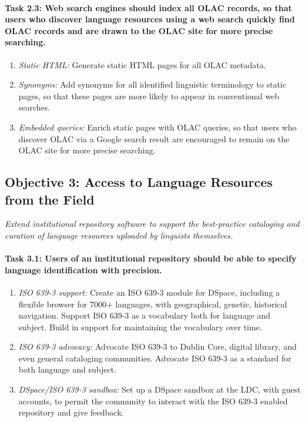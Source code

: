 \def\task{2.3}
\paragraph{Task {\task}: Web search engines should index all OLAC records,
      so that users who discover language resources using a web search
      quickly find OLAC records and are drawn to the OLAC site for
      more precise searching.}

\begin{enumerate}[label=\emph{\task\alph*}]
\item \emph{Static HTML:}
  Generate static HTML pages for all OLAC metadata.
\item \emph{Synonyms:}
  Add synonyms for all identified linguistic terminology to static pages,
  so that these pages are more likely to appear in
  conventional web searches.
\item \emph{Embedded queries:}
  Enrich static pages with OLAC queries, so that users who discover
  OLAC via a Google search result are encouraged to remain on the
  OLAC site for more precise searching.
\end{enumerate}

\subsection*{Objective 3: Access to Language Resources from the Field}

\emph{Extend institutional repository software to support the best-practice
    cataloging and curation of language resources 
    uploaded by linguists themselves.}

\def\task{3.1}
\paragraph{Task {\task}: Users of an institutional repository should be able
  to specify language identification with precision.}

\begin{enumerate}[label=\emph{\task\alph*}]
\item \emph{ISO 639-3 support:}
  Create an ISO 639-3 module for DSpace, including a flexible
  browser for 7000+ languages, with geographical, genetic, historical
  navigation. Support ISO 639-3 as a vocabulary both for language and subject.
  Build in support for maintaining the vocabulary over time.
\item \emph{ISO 639-3 advocacy:}
  Advocate ISO 639-3 to Dublin Core, digital library, and even general cataloging
  communities. Advocate ISO 639-3 as a standard for both language and subject.
\item \emph{DSpace/ISO 639-3 sandbox:}
  Set up a DSpace sandbox at the LDC, with guest accounts,
  to permit the community to interact with the
  ISO 639-3 enabled repository and give feedback.
\end{enumerate}

